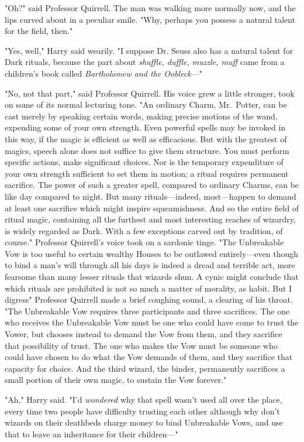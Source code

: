 "Oh?" said Professor Quirrell. The man was walking more normally now, and the
lips curved about in a peculiar smile. "Why, perhaps you possess a natural
talent for the field, then."

"Yes, well," Harry said wearily. "I suppose Dr. Seuss also has a natural talent
for Dark rituals, because the part about \emph{shuffle, duffle, muzzle, muff}
came from a children's book called \emph{Bartholomew and the Oobleck}—"

"No, not that part," said Professor Quirrell. His voice grew a little stronger,
took on some of its normal lecturing tone. "An ordinary Charm, Mr.~Potter, can
be cast merely by speaking certain words, making precise motions of the wand,
expending some of your own strength. Even powerful spells may be invoked in
this way, if the magic is efficient as well as efficacious. But with the
greatest of magics, speech alone does not suffice to give them structure. You
must perform specific actions, make significant choices. Nor is the temporary
expenditure of your own strength sufficient to set them in motion; a ritual
requires permanent sacrifice. The power of such a greater spell, compared to
ordinary Charms, can be like day compared to night. But many rituals—indeed,
most—happen to demand at least one sacrifice which might inspire
squeamishness. And so the entire field of ritual magic, containing all the
furthest and most interesting reaches of wizardry, is widely regarded as Dark.
With a few exceptions carved out by tradition, of course." Professor Quirrell's
voice took on a sardonic tinge. "The Unbreakable Vow is too useful to certain
wealthy Houses to be outlawed entirely—even though to bind a man's will
through all his days is indeed a dread and terrible act, more fearsome than
many lesser rituals that wizards shun. A cynic might conclude that which
rituals are prohibited is not so much a matter of morality, as habit. But I
digress{\el}" Professor Quirrell made a brief coughing sound, a clearing of
his throat. "The Unbreakable Vow requires three participants and three
sacrifices. The one who receives the Unbreakable Vow must be one who could have
come to trust the Vower, but chooses instead to demand the Vow from them, and
they sacrifice that possibility of trust. The one who makes the Vow must be
someone who could have chosen to do what the Vow demands of them, and they
sacrifice that capacity for choice. And the third wizard, the binder,
permanently sacrifices a small portion of their own magic, to sustain the Vow
forever."

"Ah," Harry said. "I'd \emph{wondered} why that spell wasn't used all over the
place, every time two people have difficulty trusting each other{\el}
although{\el} why don't wizards on their deathbeds charge money to bind
Unbreakable Vows, and use that to leave an inheritance for their children—"

